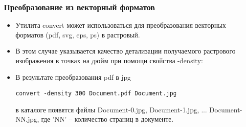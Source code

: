 \documentclass[11pt, compress]{beamer}
\renewcommand{\emph}[1]{\textcolor{dark-blue}{#1}}
\begin{document}
\begin{frame}[c, fragile]
\frametitle{Преобразование из векторный форматов}
\begin{itemize}
\item Утилита \emph{convert} может использоваться для преобразования векторных форматов (pdf, svg, eps, ps) в растровый. 
\item В этом случае указывается качество детализации получаемого растрового изображения в точках на дюйм при помощи свойства \emph{-density}:
\item В результате преобразования pdf в jpg
\begin{lstlisting}
convert -density 300 Document.pdf Document.jpg
\end{lstlisting}
в каталоге появятся файлы Document-0.jpg, Document-1.jpg, ... Document-NN.jpg, где 'NN' -- количество страниц в документе.
\end{itemize}
\end{frame}
\end{document}
